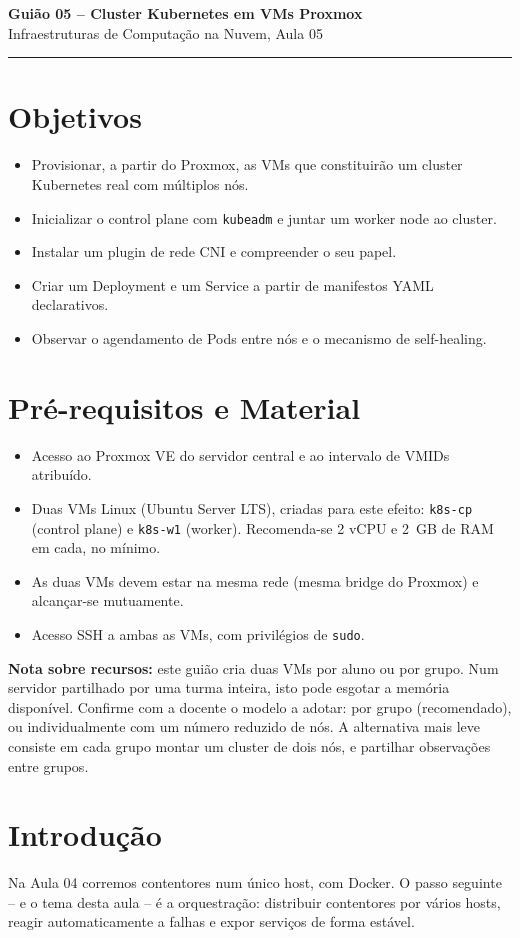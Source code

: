 \documentclass[11pt,a4paper]{article}
\newcommand{\guiaotitle}[2]{%
  \begin{center}
  {\Large\bfseries\color{TextEspresso} #1}\\[0.3cm]
  {\normalsize\color{NudeTaupe} #2}\\[0.2cm]
  {\color{NudeTaupe}\rule{4cm}{0.5pt}}
  \end{center}
  \vspace{0.5cm}
}
\begin{document}
\guiaotitle{Guião 05 -- Cluster Kubernetes em VMs Proxmox}{Infraestruturas de Computação na Nuvem, Aula 05}

\section{Objetivos}
\begin{itemize}[itemsep=0.2cm]
  \item Provisionar, a partir do Proxmox, as VMs que constituirão um cluster Kubernetes real com múltiplos nós.
  \item Inicializar o control plane com \texttt{kubeadm} e juntar um worker node ao cluster.
  \item Instalar um plugin de rede CNI e compreender o seu papel.
  \item Criar um Deployment e um Service a partir de manifestos YAML declarativos.
  \item Observar o agendamento de Pods entre nós e o mecanismo de self-healing.
\end{itemize}

\section{Pré-requisitos e Material}
\begin{itemize}[itemsep=0.2cm]
  \item Acesso ao Proxmox VE do servidor central e ao intervalo de VMIDs atribuído.
  \item Duas VMs Linux (Ubuntu Server LTS), criadas para este efeito: \texttt{k8s-cp} (control plane) e \texttt{k8s-w1} (worker). Recomenda-se 2 vCPU e 2~GB de RAM em cada, no mínimo.
  \item As duas VMs devem estar na mesma rede (mesma bridge do Proxmox) e alcançar-se mutuamente.
  \item Acesso SSH a ambas as VMs, com privilégios de \texttt{sudo}.
\end{itemize}

\textbf{Nota sobre recursos:} este guião cria duas VMs por aluno ou por grupo. Num servidor partilhado por uma turma inteira, isto pode esgotar a memória disponível. Confirme com a docente o modelo a adotar: por grupo (recomendado), ou individualmente com um número reduzido de nós. A alternativa mais leve consiste em cada grupo montar um cluster de dois nós, e partilhar observações entre grupos.

\section{Introdução}
Na Aula 04 corremos contentores num único host, com Docker. O passo seguinte -- e o tema desta aula -- é a orquestração: distribuir contentores por vários hosts, reagir automaticamente a falhas e expor serviços de forma estável.
\end{document}

